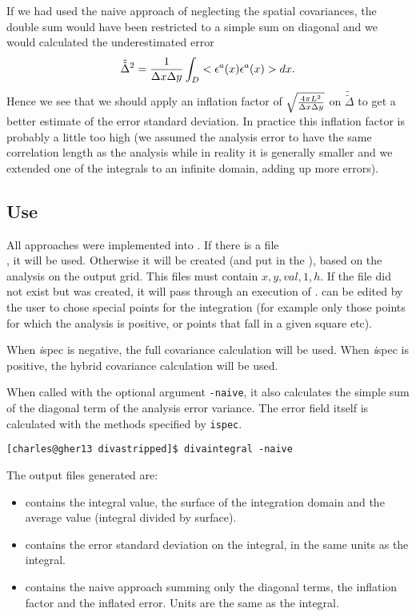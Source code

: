 If we had used the naive approach of neglecting the spatial covariances, the double sum would have been restricted to a simple sum on diagonal and we would calculated the underestimated error 
\begin{equation}
\tilde{\tilde{\Delta}}^2= {1 \over \Delta x \Delta y} \int_D <{\epsilon}^a(x) {\epsilon}^a(x) >  d x.
\end{equation}
Hence we see that we should apply an inflation factor of $\sqrt{{4 \pi L^2 \over \Delta x \Delta y}}$ on $\tilde{\tilde{\Delta}}$ to get a better estimate of the error standard deviation. In practice  this inflation factor is probably a little too high (we assumed the analysis error to have the same correlation length as the analysis while in reality it is generally smaller and we extended one of the integrals to an infinite domain, adding up more errors).


\subsection{Use}

All approaches were implemented into . If there is a file\\ 
, it will be used.
Otherwise it will be created (and put in the ), based on the analysis on the output grid. This files must contain $x,y,val,1,h$. If the file did not exist but was created, it will pass through an execution of . 
 can be edited by the user to chose special points for the integration (for example only those points for which the analysis is positive, or points that fall in a given square etc). 

When {\textit ispec } is negative, the full covariance calculation will be used. When {\textit ispec } is positive, the hybrid covariance calculation will be used.

When called with the optional argument \texttt{-naive}, it also calculates the simple sum of the diagonal term of the analysis error variance. The error field itself is calculated with the methods specified by \texttt{ispec}. 

\begin{lstlisting}[style=Bash]
[charles@gher13 divastripped]$ divaintegral -naive
\end{lstlisting}

The output files generated are:
\begin{itemize}
\item {} contains the integral value, the surface of the integration domain and the average value (integral divided by surface).
\item {} contains the error standard deviation on the integral, in the same units as the integral.
\item {} contains the naive approach summing only the diagonal terms, the inflation factor and the inflated error. Units are the same as the integral.
\end{itemize}

